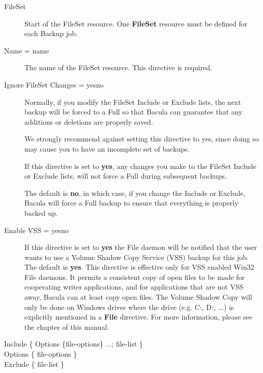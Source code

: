 \begin{description}

\item [FileSet]
Start of the FileSet resource. One {\bf FileSet}  resource must be
defined for each Backup job.

\item [Name = \lt{}name\gt{}]
   The name of the FileSet resource.  This directive is required. 

\item [Ignore FileSet Changes = \lt{}yes\vb{}no\gt{}]
   Normally, if you modify the FileSet Include or Exclude lists,
   the next backup will be forced to a Full so that Bacula can
   guarantee that any additions or deletions are properly saved.

   We strongly recommend against setting this directive to yes, 
   since doing so may cause you to have an incomplete set of backups.

   If this directive is set to {\bf yes}, any changes you make to the
   FileSet Include or Exclude lists, will not force a Full during 
   subsequent backups.

   The default is {\bf no}, in which case, if you change the Include or
   Exclude, Bacula will force a Full backup to ensure that everything is
   properly backed up.

\item [Enable VSS = \lt{}yes\vb{}no\gt{}]
  If this directive is set to {\bf yes} the File daemon will be notified
  that the user wants to use a Volume Shadow Copy Service (VSS) backup
  for this job. The default is {\bf yes}. This directive is effective
  only for VSS enabled Win32 File daemons. It permits a consistent copy
  of open files to be made for cooperating writer applications, and for
  applications that are not VSS away, Bacula can at least copy open files.
  The Volume Shadow Copy will only be done on Windows drives where the
  drive (e.g. C:, D:, ...) is explicitly mentioned in a {\bf File}
  directive.
  For more information, please see the
   chapter of this manual.


\item [Include \{ Options \{\lt{}file-options\gt{}\} ...;
   \lt{}file-list\gt{} \} ]

\item [Options \{ \lt{}file-options\gt{} \} ]

\item [Exclude \{ \lt{}file-list\gt{} \}]


\end{description}

